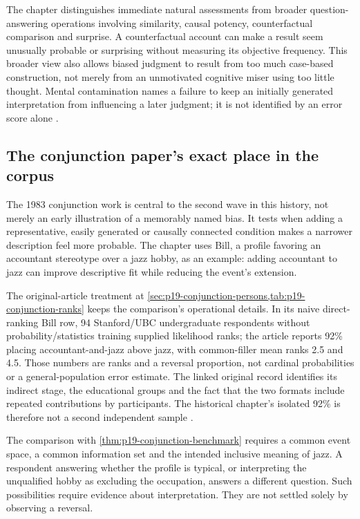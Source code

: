 The chapter distinguishes immediate natural assessments from broader
question-answering operations involving similarity, causal potency,
counterfactual comparison and surprise. A counterfactual account can
make a result seem unusually probable or surprising without measuring
its objective frequency. This broader view also allows biased judgment
to result from too much case-based construction, not merely from an
unmotivated cognitive miser using too little thought. Mental contamination
names a failure to keep an initially generated interpretation from
influencing a later judgment; it is not identified by an error score alone
\cite[pp.~336--338]{GriffinEtAl2012HeuristicsHistory}.

\subsection{The conjunction paper's exact place in the corpus}
\label{sec:p19-hph-conjunction-place}

The 1983 conjunction work is central to the second wave in this history,
not merely an early illustration of a memorably named bias. It tests
when adding a representative, easily generated or causally connected
condition makes a narrower description feel more probable. The chapter
uses Bill, a profile favoring an accountant stereotype over a jazz hobby,
as an example: adding accountant to jazz can improve descriptive fit
while reducing the event's extension.

The original-article treatment at
\cref{sec:p19-conjunction-persons,tab:p19-conjunction-ranks}
keeps the comparison's operational details. In its naive direct-ranking
Bill row, 94 Stanford/UBC undergraduate respondents without
probability/statistics training supplied likelihood ranks; the article
reports 92\% placing accountant-and-jazz above jazz, with common-filler
mean ranks 2.5 and 4.5. Those numbers are ranks and a reversal proportion,
not cardinal probabilities or a general-population error estimate.
The linked original record identifies its indirect stage, the educational
groups and the fact that the two formats include repeated contributions
by participants. The historical chapter's isolated 92\% is therefore
not a second independent sample
\cite[p.~298, table~1]{TverskyKahneman1983Conjunction}
\cite[p.~337]{GriffinEtAl2012HeuristicsHistory}.

The comparison with \cref{thm:p19-conjunction-benchmark} requires a common
event space, a common information set and the intended inclusive meaning
of jazz. A respondent answering whether the profile is typical, or
interpreting the unqualified hobby as excluding the occupation, answers
a different question. Such possibilities require evidence about
interpretation. They are not settled solely by observing a reversal.

